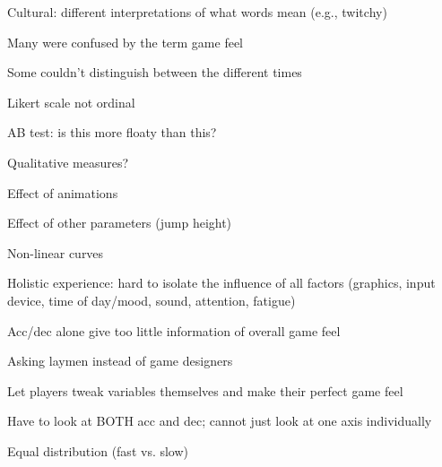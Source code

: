 Cultural: different interpretations of what words mean (e.g., twitchy)

Many were confused by the term game feel

Some couldn't distinguish between the different times

Likert scale not ordinal

AB test: is this more floaty than this?

Qualitative measures?

Effect of animations

Effect of other parameters (jump height)

Non-linear curves

Holistic experience: hard to isolate the influence of all factors (graphics, input device, time of day/mood, sound, attention, fatigue)

Acc/dec alone give too little information of overall game feel

Asking laymen instead of game designers

Let players tweak variables themselves and make their perfect game feel

Have to look at BOTH acc and dec; cannot just look at one axis individually

Equal distribution (fast vs. slow)